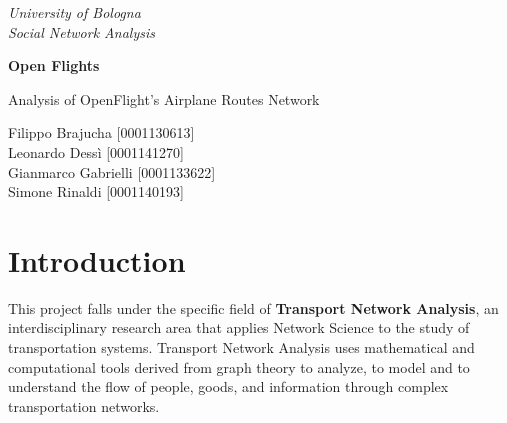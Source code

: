 \documentclass[12pt]{article}
\begin{document}
    \begin{titlepage}

        \begin{center}
        { \textit{University of Bologna} }
            \\
            \vspace{5mm}
            { \textit{Social Network Analysis} }\\
        \end{center}

        \vspace{20mm}

        \begin{center}
        {\LARGE{\textbf{Open Flights}}}
            \\
        \end{center}

        \vspace{20mm}

        \begin{center}
        {\LARGE{Analysis of OpenFlight's Airplane Routes Network}}
            \\
        \end{center}

        \vspace{30mm}

        \begin{center}
        {\large{Filippo Brajucha [0001130613]\\}}
            \vspace{5mm}
            {\large{Leonardo Dessì [0001141270] \\}}
            \vspace{5mm}
            {\large{Gianmarco Gabrielli [0001133622]  \\}}
            \vspace{5mm}
            {\large{Simone Rinaldi [0001140193]\\}}
        \end{center}

        \vspace{40mm}

    \end{titlepage}

    \tableofcontents
    \newpage


    \section{Introduction}\label{sec:introduction}
    This project falls under the specific field of \textbf{Transport Network Analysis}, an interdisciplinary research area that applies Network Science to the study of transportation systems. Transport Network Analysis uses mathematical and computational tools derived from graph theory to analyze, to model and to understand the flow of people, goods, and information through complex transportation networks.
\end{document}
